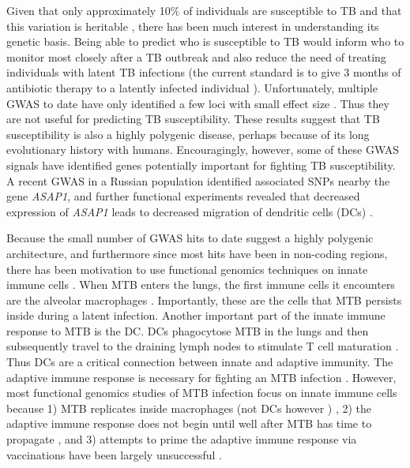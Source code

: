 Given that only approximately 10\% of individuals are susceptible to
TB and that this variation is heritable \citep{Kallmann1943,
  Comstock1978, Cobat2010, Moller2010}, there has been much interest
in understanding its genetic basis. Being able to predict who is
susceptible to TB would inform who to monitor most closely after a TB
outbreak and also reduce the need of treating individuals with latent
TB infections (the current standard is to give 3 months of antibiotic
therapy to a latently infected individual
\citep{Munoz2015}). Unfortunately, multiple GWAS to date have only
identified a few loci with small effect size \citep{Thye2010,
  Mahasirimongkol2012, Thye2012, Png2012, Chimusa2014, Curtis2015,
  Sobota2016}.  Thus they are not useful for predicting TB
susceptibility. These results suggest that TB susceptibility is also a
highly polygenic disease, perhaps because of its long evolutionary
history with humans. Encouragingly, however, some of these GWAS
signals have identified genes potentially important for fighting TB
susceptibility. A recent GWAS in a Russian population identified
associated SNPs nearby the gene \emph{ASAP1}, and further functional
experiments revealed that decreased expression of \emph{ASAP1} leads
to decreased migration of dendritic cells (DCs) \citep{Curtis2015}.

Because the small number of GWAS hits to date suggest a highly
polygenic architecture, and furthermore since most hits have been in
non-coding regions, there has been motivation to use functional
genomics techniques on innate immune cells \citep{Thuong2008,
  Barreiro2012, Pacis2015}.  When MTB enters the lungs, the first
immune cells it encounters are the alveolar macrophages
\citep{Tailleux2008, Ernst2012, Sia2015}. Importantly, these are the
cells that MTB persists inside during a latent infection. Another
important part of the innate immune response to MTB is the DC. DCs
phagocytose MTB in the lungs and then subsequently travel to the
draining lymph nodes to stimulate T cell maturation
\citep{Tailleux2008, Ernst2012, Sia2015}. Thus DCs are a critical
connection between innate and adaptive immunity. The adaptive immune
response is necessary for fighting an MTB infection
\citep{Flynn1992}. However, most functional genomics studies of MTB
infection focus on innate immune cells because 1) MTB replicates
inside macrophages \citep{Sia2015} (not DCs however
\citep{Tailleux2003}) , 2) the adaptive immune response does not begin
until well after MTB has time to propagate \citep{Khan2016}, and 3)
attempts to prime the adaptive immune response via vaccinations have
been largely unsuccessful \citep{Wang2013}.

